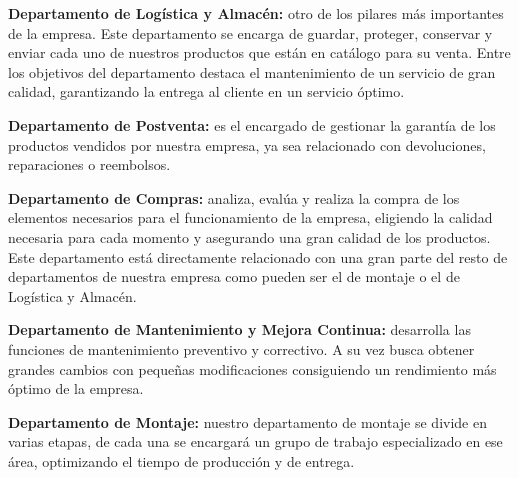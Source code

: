 \textbf{Departamento de Logística y Almacén:} otro de los pilares más importantes de la empresa. Este departamento se encarga de guardar, proteger, conservar y enviar cada uno de nuestros productos que están en catálogo para su venta. Entre los objetivos del departamento destaca el mantenimiento de un servicio de gran calidad, garantizando la entrega al cliente en un servicio óptimo.

\textbf{Departamento de Postventa:} es el encargado de gestionar la garantía de los productos vendidos por nuestra empresa, ya sea relacionado con devoluciones, reparaciones o reembolsos. 

\textbf{Departamento de Compras:} analiza, evalúa y realiza la compra de los elementos necesarios para el funcionamiento de la empresa, eligiendo la calidad necesaria para cada momento y asegurando una gran calidad de los productos. Este departamento está directamente relacionado con una gran parte del resto de departamentos de nuestra empresa como pueden ser el de montaje o el de Logística y Almacén.

\textbf{Departamento de Mantenimiento y Mejora Continua:} desarrolla las funciones de mantenimiento preventivo y correctivo. A su vez busca obtener grandes cambios con pequeñas modificaciones consiguiendo un rendimiento más óptimo de la empresa.

\textbf{Departamento de Montaje:} nuestro departamento de montaje se divide en varias etapas, de cada una se encargará un grupo de trabajo especializado en ese área, optimizando el tiempo de producción y de entrega.
